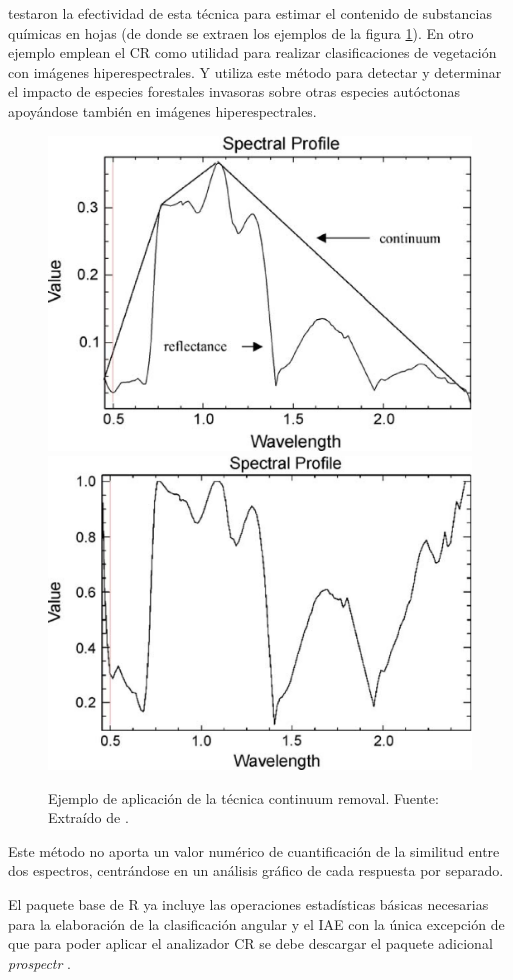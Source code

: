 \cite{huang2004estimating} testaron la efectividad de esta técnica para estimar el contenido de substancias químicas en hojas (de donde se extraen los ejemplos de la figura \ref{fig:ejemploCR}). En otro ejemplo \cite{filippi2007effect} emplean el \ac{CR} como utilidad para realizar clasificaciones de vegetación con imágenes hiperespectrales. Y \cite{underwood2003mapping} utiliza este método para detectar y determinar el impacto de especies forestales invasoras sobre otras especies autóctonas apoyándose también en imágenes hiperespectrales.\Sep

\begin{figure}
	\centering
	\includegraphics[width=0.5\linewidth]{./Imagenes/CR1.eps}
	\includegraphics[width=0.5\linewidth]{./Imagenes/CR2.eps}
	\caption[Continuum Removal ejemplo]{Ejemplo de aplicación de la técnica continuum removal. Fuente: Extraído de \cite{huang2004estimating}.}
	\label{fig:ejemploCR}
\end{figure}

Este método no aporta un valor numérico de cuantificación de la similitud entre dos espectros, centrándose en un análisis gráfico de cada respuesta por separado.\Sep

El paquete base de R ya incluye las operaciones estadísticas básicas necesarias para la elaboración de la clasificación angular y el \ac{IAE} con la única excepción de que para poder aplicar el analizador \ac{CR} se debe descargar el paquete adicional \textit{prospectr} \citep{stevens2014introduction}.\Sep

